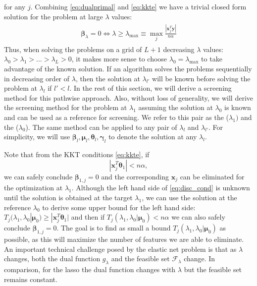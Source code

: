 for any $j$. Combining \eqref{eq:dualprimal} and \eqref{eq:kkte} we have a trivial closed form solution for the problem at large $\lambda$ values:
\begin{gather}
    \label{eq:lammax}
    \begin{aligned}
        \boldsymbol\beta_\lambda=0\iff \lambda \geq \lambda_{\max}\equiv \max_j \frac{|\boldsymbol x_j^T\boldsymbol y|}{n\alpha}
    \end{aligned}
\end{gather}
Thus, when solving the problems on a grid of $L+1$ decreasing $\lambda$ values: $\lambda_0>\lambda_1>...>\lambda_L>0$, it makes more sense to choose $\lambda_0=\lambda_{\max}$ to take advantage of the known solution. If an algorithm solves the problems sequentially in decreasing order of $\lambda$, then the solution at $\lambda_{l'}$ will be known before solving the problem at $\lambda_l$ if $l'<l$. In the rest of this section, we will derive a screening method for this pathwise approach. Also, without loss of generality, we will derive the screening method for the problem at $\lambda_1$ assuming the solution at $\lambda_0$ is known and can be used as a reference for screening. We refer to this pair as the  ($\lambda_1)$ and the  ($\lambda_0$). The same method can be applied to any pair of $\lambda_{l}$ and $\lambda_{l'}$. For simplicity, we will use $\boldsymbol\beta_l,\boldsymbol\mu_l,\boldsymbol\theta_l,\boldsymbol\gamma_l$ to denote the solution at any $\lambda_l$.

Note that from the KKT conditions \eqref{eq:kkte}, if
\begin{equation}
    \label{eq:disc_cond}
    |\boldsymbol x_j^T\boldsymbol\theta_{1}|<n\alpha,
\end{equation}
we can safely conclude $\boldsymbol\beta_{1,j}=0$ and the corresponding $\boldsymbol x_j$ can be eliminated for the optimization at $\lambda_1$. Although the left hand side of \eqref{eq:disc_cond} is unknown until the solution is obtained at the target $\lambda_1$, we can use the solution at the reference $\lambda_{0}$ to derive some upper bound for the left hand side: $T_j(\lambda_{1},\lambda_{0}|\boldsymbol\mu_0)\geq |\boldsymbol x_j^T\boldsymbol\theta_1|$ and then if $T_j(\lambda_{1},\lambda_{0}|\boldsymbol\mu_0)<n\alpha$ we can also safely conclude $\boldsymbol\beta_{1,j}=0$. The goal is to find as small a bound $T_j(\lambda_{1},\lambda_{0}|\boldsymbol\mu_0)$ as possible, as this will maximize the number of features we are able to eliminate. An important technical challenge posed by the elastic net problem is that as $\lambda$ changes, both the dual function $g_\lambda$ and the feasible set $\mathcal{F}_\lambda$ change. In comparison, for the lasso the dual function changes with $\lambda$ but the feasible set remains constant.

